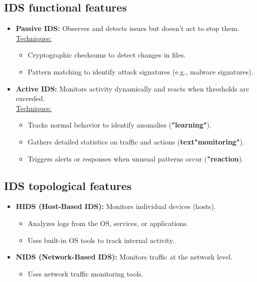 \subsection{IDS functional features}
\begin{itemize}
    \item \textbf{Passive IDS:} Observes and detects issues but doesn’t act to stop them.\\ \underline{Techniques:}
    \begin{itemize}
        \item Cryptographic checksums to detect changes in files.
        \item Pattern matching to identify attack signatures (e.g., malware signatures).
    \end{itemize}
    \item \textbf{Active IDS:} Monitors activity dynamically and reacts when thresholds are exceeded.\\ \underline{Techniques:}
    \begin{itemize}
        \item Tracks normal behavior to identify anomalies (\textbf{"learning"}).
        \item Gathers detailed statistics on traffic and actions (\textbf{text"monitoring"}).
        \item Triggers alerts or responses when unusual patterns occur (\textbf{"reaction}).
    \end{itemize}
\end{itemize}

\subsection{IDS topological features}
\begin{itemize}
    \item \textbf{HIDS (Host-Based IDS):} Monitors individual devices (hosts).
    \begin{itemize}
        \item Analyzes logs from the OS, services, or applications.
        \item Uses built-in OS tools to track internal activity.
    \end{itemize}
    \item \textbf{NIDS (Network-Based IDS):} Monitors traffic at the network level.
    \begin{itemize}
        \item Uses network traffic monitoring tools.
    \end{itemize}
\end{itemize}

